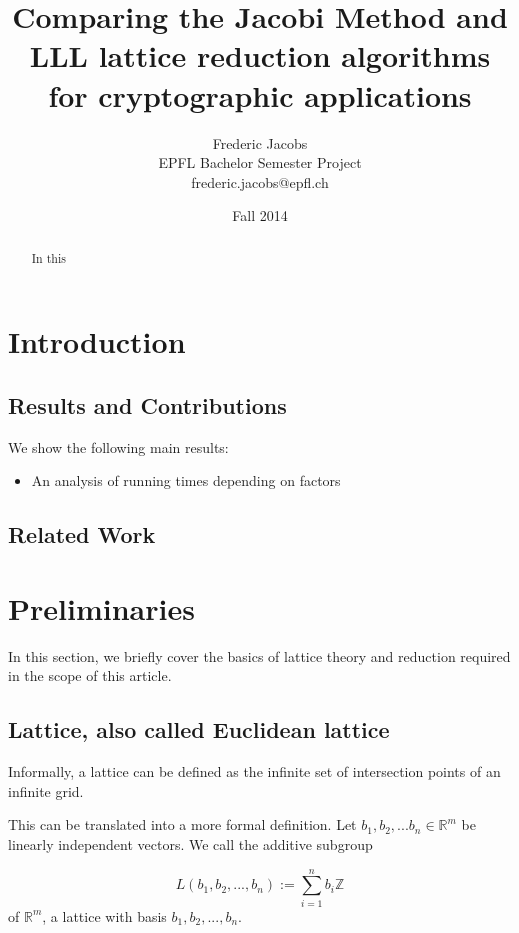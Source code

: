 \documentclass[10pt]{article}
\title{Comparing the Jacobi Method and LLL lattice reduction algorithms for cryptographic applications}
\date{Fall 2014}
\author{Frederic Jacobs\\ EPFL Bachelor Semester Project\\ frederic.jacobs@epfl.ch}
\begin{document}
\maketitle

\begin{abstract}
In this \cite{originalJacobiMethodLatticeBasisReduction}
\end{abstract}

\section{Introduction}


\subsection{Results and Contributions}

We show the following main results:
\begin{itemize}
\item An analysis of running times depending on factors
\end{itemize}


\subsection{Related Work}

\section{Preliminaries}

In this section, we briefly cover the basics of lattice theory and reduction required in the scope of this article.

\subsection{Lattice, also called Euclidean lattice}

Informally, a lattice can be defined as the infinite set of intersection points of an infinite grid.

This can be translated into a more formal definition\cite{SchnorrStanfordNotes}.\newline 
Let $b_1, b_2, ... b_n \in \mathbb{R}^m$ be linearly independent vectors. We call the additive subgroup

\[
L(b_1,b_2,...,b_n):= \displaystyle\sum_{i=1}^{n}b_i \mathbb{Z}
\] of $\mathbb{R}^m$, a lattice with basis $b_1,b_2,...,b_n$.
\end{document}
